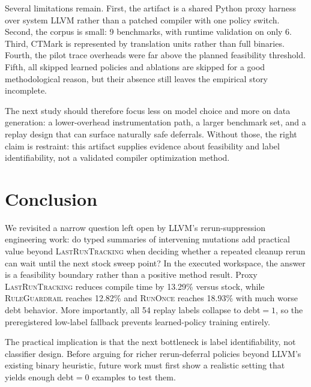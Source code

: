 \documentclass{article}
\begin{document}
Several limitations remain. First, the artifact is a shared Python proxy harness over system LLVM rather than a patched compiler with one policy switch. Second, the corpus is small: 9 benchmarks, with runtime validation on only 6. Third, CTMark is represented by translation units rather than full binaries. Fourth, the pilot trace overheads were far above the planned feasibility threshold. Fifth, all skipped learned policies and ablations are skipped for a good methodological reason, but their absence still leaves the empirical story incomplete.

The next study should therefore focus less on model choice and more on data generation: a lower-overhead instrumentation path, a larger benchmark set, and a replay design that can surface naturally safe deferrals. Without those, the right claim is restraint: this artifact supplies evidence about feasibility and label identifiability, not a validated compiler optimization method.

\section{Conclusion}

We revisited a narrow question left open by LLVM's rerun-suppression engineering work: do typed summaries of intervening mutations add practical value beyond \textsc{LastRunTracking} when deciding whether a repeated cleanup rerun can wait until the next stock sweep point? In the executed workspace, the answer is a feasibility boundary rather than a positive method result. Proxy \textsc{LastRunTracking} reduces compile time by 13.29\% versus stock, while \textsc{RuleGuardrail} reaches 12.82\% and \textsc{RunOnce} reaches 18.93\% with much worse debt behavior. More importantly, all 54 replay labels collapse to debt$=1$, so the preregistered low-label fallback prevents learned-policy training entirely.

The practical implication is that the next bottleneck is label identifiability, not classifier design. Before arguing for richer rerun-deferral policies beyond LLVM's existing binary heuristic, future work must first show a realistic setting that yields enough debt$=0$ examples to test them.
\end{document}

